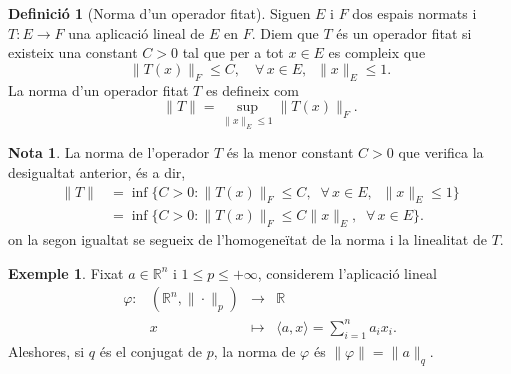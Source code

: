 \documentclass[12pt]{book}
\theoremstyle{definition}
\newtheorem{defi}[teorema]{Definició}
\theoremstyle{nota}
\newtheorem{nota}[teorema]{Nota}
\theoremstyle{exemple}
\newtheorem{exemple}[teorema]{Exemple}
\begin{document}
\begin{defi}[Norma d'un operador fitat]
  Siguen $E$ i $F$ dos espais normats i $T : E \to F$ una aplicació
  lineal de $E$ en $F$. Diem que $T$ és un operador fitat si existeix
  una constant $C > 0$ tal que per a tot $x \in E$ es compleix que
  \[
    \|T(x)\|_F \leq C, \quad \forall\, x \in E, \;\; \|x\|_E \leq 1.
  \]
  La norma d'un operador fitat $T$ es defineix com
  \[
    \|T\| = \sup_{\|x\|_E \leq 1} \|T(x)\|_F.
  \]
\end{defi}

\begin{nota}
  La norma de l'operador $T$ és la menor constant $C > 0$ que verifica
  la desigualtat anterior, és a dir,
  \begin{align*}
    \|T\| &= \inf\{C > 0 : \|T(x)\|_F \leq C,
            \;\; \forall\, x \in E, \;\; \|x\|_E \leq 1\} \\
          &= \inf\{C > 0 : \|T(x)\|_F \leq C \|x\|_E,
            \;\; \forall\, x \in E\}.
  \end{align*}
  on la segon igualtat se segueix de l'homogeneïtat de la norma i la
  linealitat de $T$.
\end{nota}

\begin{exemple}
  Fixat $a \in \mathbb{R}^n$ i $1 \leq p \leq +\infty$, considerem
  l'aplicació lineal
  \begin{equation*}
    \begin{array}{lrcl}
      \varphi :
      & (\mathbb{R}^n, \|\cdot\|_p) &\longrightarrow& \mathbb{R} \\
      & x &\longmapsto& \langle a, x \rangle = \sum\limits_{i=1}^{n}a_ix_i.
    \end{array}
  \end{equation*}
  Aleshores, si $q$ és el conjugat de $p$, la norma de $\varphi$ és
  $\|\varphi\| = \|a\|_q$.
\end{exemple}
\end{document}
